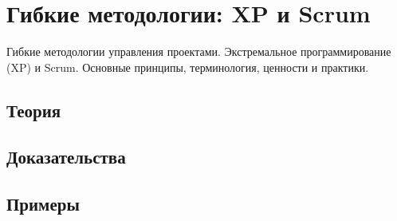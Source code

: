
\section{Гибкие методологии: XP и Scrum}
\label{sec:2.6.06-agile-xp-scrum}

\begin{ticket}
Гибкие методологии управления проектами. Экстремальное программирование (XP) и Scrum. Основные принципы, терминология, ценности и практики.
\end{ticket}

\subsection*{Теория}

\subsection*{Доказательства}

\subsection*{Примеры}
